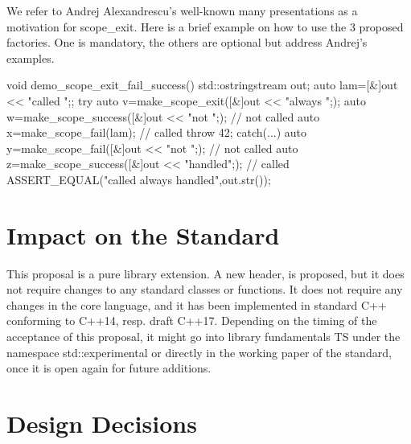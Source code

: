 \documentclass[ebook,11pt,article]{memoir}
\begin{document}
We refer to Andrej Alexandrescu's well-known many presentations as a motivation for scope_exit. Here is a brief example on how to use the 3 proposed factories. One is mandatory, the others are optional but address Andrej's examples.

\begin{codeblock}
void demo_scope_exit_fail_success(){
  std::ostringstream out{};
  auto lam=[&]{out << "called ";};
  try{
    auto v=make_scope_exit([&]{out << "always ";});
    auto w=make_scope_success([&]{out << "not ";}); // not called
    auto x=make_scope_fail(lam); // called
    throw 42;
  }catch(...){
    auto y=make_scope_fail([&]{out << "not ";}); // not called
    auto z=make_scope_success([&]{out << "handled";}); // called
  }
  ASSERT_EQUAL("called always handled",out.str());
}
\end{codeblock}


\chapter{Impact on the Standard}
This proposal is a pure library extension. A new header,  is proposed, but it does not require changes to any standard classes or functions. It does not require any changes in the core language, and it has been implemented in standard C++ conforming to C++14, resp. draft C++17. Depending on the timing of the acceptance of this proposal, it might go into library fundamentals TS under the namespace std::experimental or directly in the working paper of the standard, once it is open again for future additions.

\chapter{Design Decisions}
\end{document}
